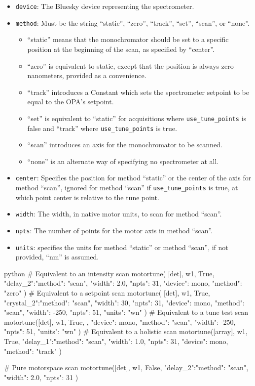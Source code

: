 \begin{itemize}
	\item \texttt{device}: The Bluesky device representing the spectrometer.
	\item \texttt{method}: Must be the string ``static'', ``zero'', ``track'', ``set'', ``scan'', or ``none''.
		\begin{itemize}
			\item ``static'' means that the monochromator should be set to a specific position at the beginning of the scan, as specified by ``center''.
			\item ``zero'' is equivalent to static, except that the position is always zero nanometers, provided as a convenience.
			\item ``track'' introduces a Constant which sets the spectrometer setpoint to be equal to the OPA's setpoint.
			\item ``set'' is equivalent to ``static'' for acquisitions where \texttt{use\_tune\_points} is false and ``track'' where \texttt{use\_tune\_points} is true.
			\item ``scan'' introduces an axis for the monochromator to be scanned.
			\item ``none'' is an alternate way of specifying no spectrometer at all.
		\end{itemize}
	\item \texttt{center}: Specifies the position for method ``static'' or the center of the axis for method ``scan'', ignored for method ``scan'' if \texttt{use\_tune\_points} is true, at which point center is relative to the tune point.
	\item \texttt{width}: The width, in native motor units, to scan for method ``scan''.
	\item \texttt{npts}: The number of points for the motor axis in method ``scan''.
	\item \texttt{units}: specifies the units for method ``static'' or method ``scan'', if not provided, ``nm'' is assumed.
\end{itemize}

\begin{codefragment}{python}
\noop# Equivalent to an intensity scan
motortune(
    [det],
    w1,
    True,
    {"delay_2":{"method": "scan", "width": 2.0, "npts": 31}},
    {"device": mono, "method": "zero"}
)
# Equivalent to a setpoint scan
motortune(
    [det],
    w1,
    True,
    {"crystal_2":{"method": "scan", "width": 30, "npts": 31}},
    {"device": mono, "method": "scan", "width": -250, "npts": 51, "units": "wn"}
)
# Equivalent to a tune test scan
motortune([det],
    w1,
    True,
    {},
    {"device": mono, "method": "scan", "width": -250, "npts": 51, "units": "wn"}
)
# Equivalent to a holistic scan
motortune([array],
    w1,
    True,
    {"delay_1":{"method": "scan", "width": 1.0, "npts": 31}},
    {"device": mono, "method": "track"}
)

# Pure motorspace scan
motortune([det],
    w1,
    False,
    {"delay_2":{"method": "scan", "width": 2.0, "npts": 31}}
)
\end{codefragment}


